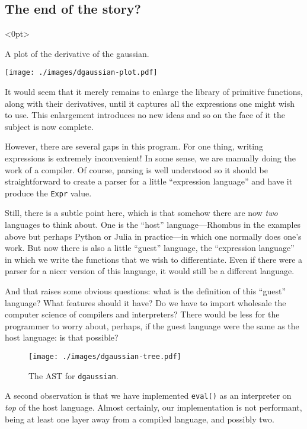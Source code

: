 \documentclass[11pt, a4paper]{article}
\newcommand{\cd}[1]{\texttt{#1}}
\begin{document}
\subsection{The end of the story?}
\begin{marginfigure}<0pt>
  \caption{A plot of the derivative of the gaussian.\label{fig:dgaussian-plot}}
  \centering
  \texttt{[image: ./images/dgaussian-plot.pdf]}
\end{marginfigure}
  
It would seem that it merely remains to enlarge the library of
primitive functions, along with their derivatives, until it captures
all the expressions one might wish to use. This enlargement introduces
no new ideas and so on the face of it the subject is now complete.

However, there are several gaps in this program. For one thing,
writing expressions is extremely inconvenient! In some sense, we are
manually doing the work of a compiler. Of course, parsing is well
understood so it should be straightforward to create a parser for a
little ``expression language'' and have it produce the \cd{Expr}
value.

Still, there is a subtle point here, which is that somehow there are
now \emph{two} languages to think about. One is the ``host''
language---Rhombus in the examples above but perhaps Python or Julia in
practice---in which one normally does one's work. But now there is also
a little ``guest'' language, the ``expression language'' in which we
write the functions that we wish to differentiate. Even if there were
a parser for a nicer version of this language, it would still be a
different language.

And that raises some obvious questions: what is the definition of this
``guest'' language? What features should it have? Do we have to import
wholesale the computer science of compilers and interpreters?  There
would be less for the programmer to worry about, perhaps, if the guest
language were the same as the host language: is that possible?
\begin{figure*}[h]
  \caption{The AST for \cd{dgaussian}.\label{fig:dgaussian-tree}}
  \centering
  \texttt{[image: ./images/dgaussian-tree.pdf]}
\end{figure*}

A second observation is that we have implemented \cd{eval()} as an
interpreter on \emph{top} of the host language. Almost certainly, our
implementation is not performant, being at least one layer away from a
compiled language, and possibly two.
\end{document}
